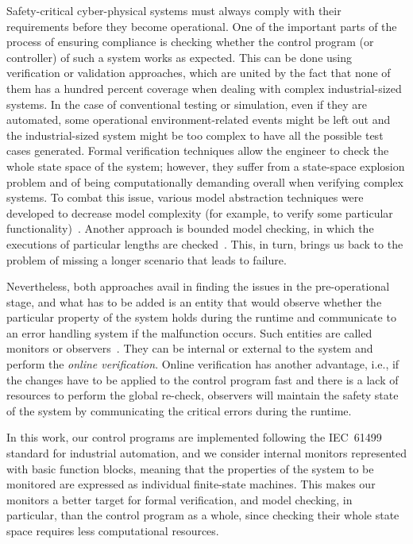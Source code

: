 \begin{bibunit}
Safety-critical cyber-physical systems must always comply with their requirements before they become operational. One of the important parts of the process of ensuring compliance is checking whether the control program (or controller) of such a system works as expected. This can be done using verification or validation approaches, which are united by the fact that none of them has a hundred percent coverage when dealing with complex industrial-sized systems. In the case of conventional testing or simulation, even if they are automated, some operational environment-related events might be left out and the industrial-sized system might be too complex to have all the possible test cases generated. Formal verification techniques allow the engineer to check the whole state space of the system; however, they suffer from a state-space explosion problem and of being computationally demanding overall when verifying complex systems. To combat this issue, various model abstraction techniques were developed to decrease model complexity (for example, to verify some particular functionality)~\cite{clarke2000,burch1992symbolic}. Another approach is bounded model checking, in which the executions of particular lengths are checked~\cite{biere2003bounded}. This, in turn, brings us back to the problem of missing a longer scenario that leads to failure.

Nevertheless, both approaches avail in finding the issues in the pre-operational stage, and what has to be added is an entity that would observe whether the particular property of the system holds during the runtime and communicate to an error handling system if the malfunction occurs. Such entities are called monitors or observers~\cite{17jhunjhunwala2022monitoring}. They can be internal or external to the system and perform the \emph{online verification}. Online verification has another advantage, i.e., if the changes have to be applied to the control program fast and there is a lack of resources to perform the global re-check, observers will maintain the safety state of the system by communicating the critical errors during the runtime.

In this work, our control programs are implemented following the IEC~61499 standard for industrial automation, and we consider internal monitors represented with basic function blocks, meaning that the properties of the system to be monitored are expressed as individual finite-state machines. This makes our monitors a better target for formal verification, and model checking, in particular, than the control program as a whole, since checking their whole state space requires less computational resources.


\end{bibunit}
